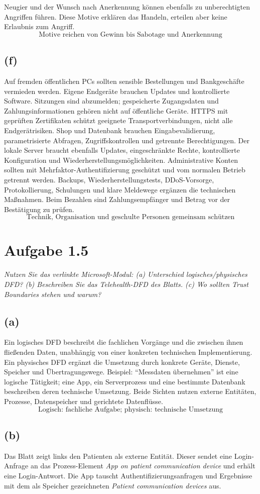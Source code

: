 \documentclass[a4paper,11pt]{article}
\newif\ifexplain
\newcommand{\aufgabe}[1]{\section*{Aufgabe #1}}
\newcommand{\angabe}[1]{\textit{#1}\par\smallskip}
\newcommand{\teil}[1]{\subsection*{(#1)}}
\newcommand{\explain}[1]{\ifexplain\begin{erklbox}#1\end{erklbox}\fi}
\newcommand{\ergebnis}[1]{\[\boxed{\text{#1}}\]}
\begin{document}
Neugier und der Wunsch nach Anerkennung können ebenfalls zu unberechtigten Angriffen führen.
Diese Motive erklären das Handeln, erteilen aber keine Erlaubnis zum Angriff.
\ergebnis{Motive reichen von Gewinn bis Sabotage und Anerkennung}
\explain{Das Motiv hilft beim Priorisieren. Ein Angreifer mit wirtschaftlichem Ziel sucht zum Beispiel
nach Konten oder verkäuflichen Daten. Die rechtliche Bewertung eines unberechtigten Zugriffs
ändert sich nicht dadurch, dass jemand nur neugierig war.}
\teil{f}
Auf fremden öffentlichen PCs sollten sensible Bestellungen und Bankgeschäfte vermieden werden.
Eigene Endgeräte brauchen Updates und kontrollierte Software. Sitzungen sind abzumelden;
gespeicherte Zugangsdaten und Zahlungsinformationen gehören nicht auf öffentliche Geräte.
HTTPS mit geprüften Zertifikaten schützt geeignete Transportverbindungen, nicht alle Endgerätrisiken.
Shop und Datenbank brauchen Eingabevalidierung, parametrisierte Abfragen, Zugriffskontrollen und getrennte Berechtigungen.
Der lokale Server braucht ebenfalls Updates, eingeschränkte Rechte, kontrollierte Konfiguration und Wiederherstellungsmöglichkeiten.
Administrative Konten sollten mit Mehrfaktor-Authentifizierung geschützt und vom normalen Betrieb getrennt werden.
Backups, Wiederherstellungstests, DDoS-Vorsorge, Protokollierung, Schulungen und klare Meldewege ergänzen die technischen Maßnahmen.
Beim Bezahlen sind Zahlungsempfänger und Betrag vor der Bestätigung zu prüfen.
\ergebnis{Technik, Organisation und geschulte Personen gemeinsam schützen}
\explain{Die Maßnahmen werden auf die vorher genannten Angriffe bezogen. Wir versprechen keine absolute
Sicherheit: Gute Schutzmechanismen senken konkrete Risiken. Restrisiken und die Prüfung der Wirksamkeit bleiben Teil des Betriebs.}

\aufgabe{1.5}
\angabe{Nutzen Sie das verlinkte Microsoft-Modul: (a) Unterschied logisches/physisches DFD?
(b) Beschreiben Sie das Telehealth-DFD des Blatts. (c) Wo sollten Trust Boundaries stehen und warum?}
\teil{a}
Ein logisches DFD beschreibt die fachlichen Vorgänge und die zwischen ihnen fließenden Daten, unabhängig von einer konkreten technischen Implementierung.
Ein physisches DFD ergänzt die Umsetzung durch konkrete Geräte, Dienste, Speicher und Übertragungswege.
Beispiel: ``Messdaten übernehmen'' ist eine logische Tätigkeit; eine App, ein Serverprozess und eine bestimmte Datenbank beschreiben deren technische Umsetzung.
Beide Sichten nutzen externe Entitäten, Prozesse, Datenspeicher und gerichtete Datenflüsse.
\ergebnis{Logisch: fachliche Aufgabe; physisch: technische Umsetzung}
\explain{Wir fragen zuerst, was mit den Daten passiert. Erst danach kommt die Frage, welche Software
oder welches Gerät das erledigt. Diese Trennung verhindert, dass eine Produktliste mit einem
vollständigen Modell des Datenflusses verwechselt wird.}
\teil{b}
Das Blatt zeigt links den Patienten als externe Entität. Dieser sendet eine Login-Anfrage an das Prozess-Element
\emph{App on patient communication device} und erhält eine Login-Antwort.
Die App tauscht Authentifizierungsanfragen und Ergebnisse mit dem als Speicher gezeichneten
\emph{Patient communication devices} aus.
\end{document}
